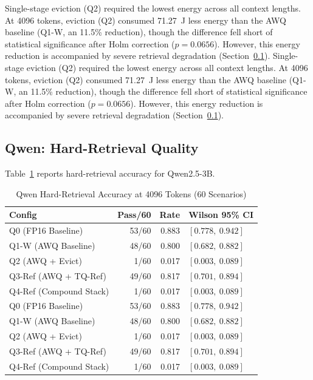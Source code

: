 \documentclass[sigconf,nonacm]{acmart}
\begin{document}
Single-stage eviction (Q2) required the lowest energy across all context lengths. At 4096 tokens, eviction (Q2) consumed 71.27~J less energy than the AWQ baseline (Q1-W, an 11.5\% reduction), though the difference fell short of statistical significance after Holm correction ($p = 0.0656$). However, this energy reduction is accompanied by severe retrieval degradation (Section~\ref{sec:qwen-quality}).
Single-stage eviction (Q2) required the lowest energy across all context lengths. At 4096 tokens, eviction (Q2) consumed 71.27~J less energy than the AWQ baseline (Q1-W, an 11.5\% reduction), though the difference fell short of statistical significance after Holm correction ($p = 0.0656$). However, this energy reduction is accompanied by severe retrieval degradation (Section~\ref{sec:qwen-quality}).

\subsection{Qwen: Hard-Retrieval Quality}
\label{sec:qwen-quality}

Table~\ref{tab:qwen-quality} reports hard-retrieval accuracy for Qwen2.5-3B.

\begin{table}[htbp]
\caption{Qwen Hard-Retrieval Accuracy at 4096 Tokens (60 Scenarios)}
\label{tab:qwen-quality}
\centering\small
\begin{tabular}{lrrl}
\toprule
\textbf{Config} & \textbf{Pass/60} & \textbf{Rate} & \textbf{Wilson 95\% CI} \\
\midrule
Q0 (FP16 Baseline)      & 53/60 & 0.883 & $[0.778,\ 0.942]$ \\
Q1-W (AWQ Baseline)     & 48/60 & 0.800 & $[0.682,\ 0.882]$ \\
Q2 (AWQ + Evict)        & 1/60  & 0.017 & $[0.003,\ 0.089]$ \\
Q3-Ref (AWQ + TQ-Ref)   & 49/60 & 0.817 & $[0.701,\ 0.894]$ \\
Q4-Ref (Compound Stack) & 1/60  & 0.017 & $[0.003,\ 0.089]$ \\
Q0 (FP16 Baseline)      & 53/60 & 0.883 & $[0.778,\ 0.942]$ \\
Q1-W (AWQ Baseline)     & 48/60 & 0.800 & $[0.682,\ 0.882]$ \\
Q2 (AWQ + Evict)        & 1/60  & 0.017 & $[0.003,\ 0.089]$ \\
Q3-Ref (AWQ + TQ-Ref)   & 49/60 & 0.817 & $[0.701,\ 0.894]$ \\
Q4-Ref (Compound Stack) & 1/60  & 0.017 & $[0.003,\ 0.089]$ \\
\bottomrule
\end{tabular}
\end{table}
\end{document}
